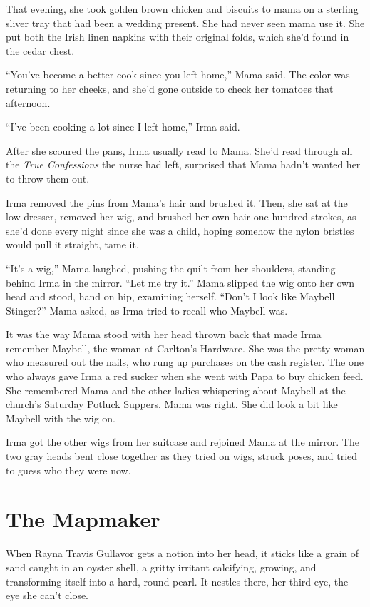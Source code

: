 \documentclass[twoside,10pt]{book}
\begin{document}
That evening, she took golden brown chicken and biscuits to mama on a
sterling sliver tray that had been a wedding present. She had never seen
mama use it. She put both the Irish linen napkins with their original
folds, which she'd found in the cedar chest.

``You've become a better cook since you left home,'' Mama said. The
color was returning to her cheeks, and she'd gone outside to check her
tomatoes that afternoon.

``I've been cooking a lot since I left home,'' Irma said.

After she scoured the pans, Irma usually read to Mama. She'd read
through all the \emph{True Confessions} the nurse had left, surprised
that Mama hadn't wanted her to throw them out.

Irma removed the pins from Mama's hair and brushed it. Then, she sat at
the low dresser, removed her wig, and brushed her own hair one hundred
strokes, as she'd done every night since she was a child, hoping somehow
the nylon bristles would pull it straight, tame it.

``It's a wig,'' Mama laughed, pushing the quilt from her shoulders,
standing behind Irma in the mirror. ``Let me try it.'' Mama slipped the
wig onto her own head and stood, hand on hip, examining herself. ``Don't
I look like Maybell Stinger?'' Mama asked, as Irma tried to recall who
Maybell was.

It was the way Mama stood with her head thrown back that made Irma
remember Maybell, the woman at Carlton's Hardware. She was the pretty
woman who measured out the nails, who rung up purchases on the cash
register. The one who always gave Irma a red sucker when she went with
Papa to buy chicken feed. She remembered Mama and the other ladies
whispering about Maybell at the church's Saturday Potluck Suppers. Mama
was right. She did look a bit like Maybell with the wig on.

Irma got the other wigs from her suitcase and rejoined Mama at the
mirror. The two gray heads bent close together as they tried on wigs,
struck poses, and tried to guess who they were now.



\cleardoublepage
\chapter{The Mapmaker}

When Rayna Travis Gullavor gets a notion into her head, it sticks like a
grain of sand caught in an oyster shell, a gritty irritant calcifying,
growing, and transforming itself into a hard, round pearl. It nestles
there, her third eye, the eye she can't close.
\end{document}
